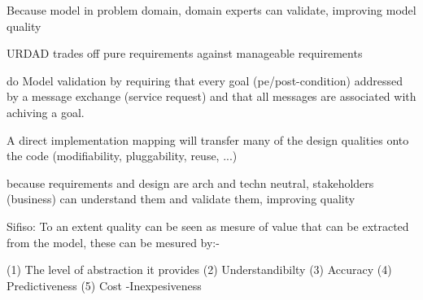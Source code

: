 Because model in problem domain, domain experts can validate, improving model quality

URDAD trades off pure requirements against manageable requirements

\cite{graham_requirements_2008} do Model validation by requiring that every goal (pe/post-condition) addressed by a message exchange (service request) and that all messages are associated with achiving a goal.

A direct implementation mapping will transfer many of the design qualities onto the code (modifiability, pluggability, reuse, ...)

because requirements and design are arch and techn neutral, stakeholders (business) can understand them and validate them, improving quality


Sifiso:
To an extent quality can be seen as mesure of value that can be extracted from the model, these can be mesured by:-

(1) The level of abstraction it provides
(2) Understandibilty 
(3) Accuracy 
(4) Predictiveness
(5) Cost -Inexpesiveness 
\cite{selic_pragmatic_mdd_20003}
